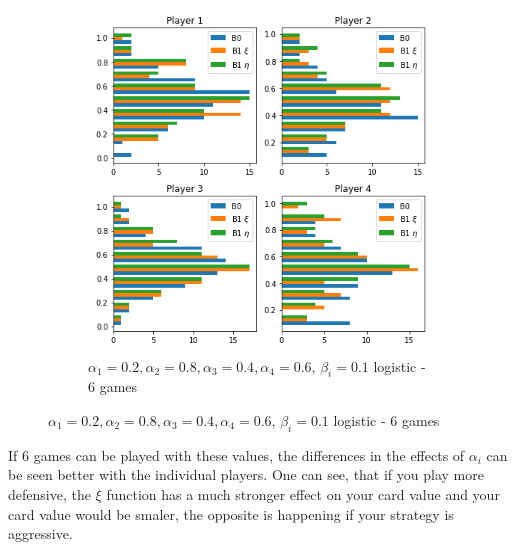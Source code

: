 \begin{figure}[ht]
\begin{subfigure}{0.5\textwidth}
    \includegraphics[width=1\linewidth]{Bilder/example_2}
    \caption{$\alpha_1=0.2,\alpha_2=0.8,\alpha_3=0.4,\alpha_4=0.6$, $\beta_i=0.1$ logistic - 6 games}
    \label{fig:18}
\end{subfigure}
\end{figure}

If 6 games can be played with these values, the differences in the effects of $\alpha_i$ can be seen better with the individual players. One can see, that if you play more defensive, the $\xi$ function has a much stronger effect on your card value and your card value would be smaler, the opposite is happening if your strategy is aggressive.




